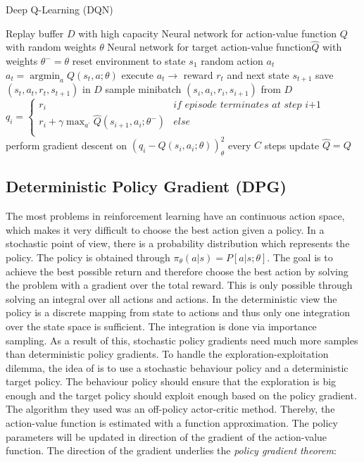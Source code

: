 \begin{algorithm}
	\caption{Deep Q-Learning (DQN)}\label{DQN-algo}
	\begin{algorithmic}
		\REQUIRE Replay buffer $\mathit{D}$ with high capacity
		\REQUIRE Neural network for action-value function $\mathit{Q}$
		with random weights $\theta$
		\REQUIRE Neural network for target action-value function$
		\mathit{\hat{Q}}$ with weights $\theta^-=\theta$
		\STATE reset environment to state $s_1$
		\STATE random action $a_t$
		\ELSE
		\STATE $a_t=\operatorname*{argmin}_a Q(s_t,a;\theta)$
		\ENDIF
		\STATE execute $a_t \rightarrow$ reward $r_t$ and next state 
		$s_{t+1}$
		\STATE save $(s_t, a_t, r_t,s_{t+1})$ in $D$
		\STATE sample minibatch $(s_i, a_i, r_i,s_{i+1})$ from $D$
		\STATE $q_i =
			\begin{cases}
			r_i & \textit{if episode terminates at step i+1}\\
			r_i+\gamma \max_{a^{'}}\hat{Q}(s_{i+1}, a_i;\theta^{-})& 
			else\\			
			\end{cases}$
		\STATE perform gradient descent on $\left(q_i-Q\left(s_i, 
		a_i;\theta\right)\right)^2_\theta$
		\STATE every $C$ steps update $\hat{Q}=Q$
		\ENDFOR
		\ENDFOR
	\end{algorithmic}
\end{algorithm}
\subsection{Deterministic Policy Gradient (DPG)}
\label{sec:DPG}
\nocite{lillicrap2015continuous}
The most problems in reinforcement learning have an continuous action space, 
which makes it very difficult to choose the best action given a policy. In a 
stochastic point of view, there is a probability distribution which represents 
the policy. The policy is obtained through $\pi_\theta(a|s) =P[a|s;\theta]$. 
The goal is to achieve the best possible return and therefore choose the best 
action by solving the problem with a gradient over the total reward. This is 
only possible through solving an integral over all actions and actions. In the 
deterministic view the policy is a discrete mapping from state to actions and 
thus only one integration over the state space is sufficient. The integration 
is done via importance sampling. As a result of 
this, stochastic policy gradients need much more samples than deterministic 
policy gradients. To handle the exploration-exploitation dilemma, the idea of 
\citeauthor{silver2014deterministic} is to use a stochastic behaviour policy  
and a deterministic target policy. The behaviour policy should ensure that the 
exploration is big enough and the target policy should exploit enough based on 
the policy gradient. The algorithm they used was an off-policy actor-critic 
method. Thereby, the action-value function is estimated with a function 
approximation. The policy parameters will be updated in direction of the 
gradient of the action-value function. The direction of the gradient underlies 
the \textit{policy gradient theorem}: 

